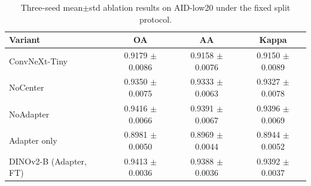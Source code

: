 \begin{table}[t]
  \centering
  \caption{Three-seed mean$\pm$std ablation results on AID-low20 under the fixed split protocol.}
  \label{tab:aid-low20_ablation}
  \begin{tabular}{l c c c}
    \toprule
    Variant & OA & AA & Kappa \\
    \midrule
    ConvNeXt-Tiny & 0.9179 $\pm$ 0.0086 & 0.9158 $\pm$ 0.0076 & 0.9150 $\pm$ 0.0089 \\
    NoCenter & 0.9350 $\pm$ 0.0075 & 0.9333 $\pm$ 0.0063 & 0.9327 $\pm$ 0.0078 \\
    NoAdapter & 0.9416 $\pm$ 0.0066 & 0.9391 $\pm$ 0.0067 & 0.9396 $\pm$ 0.0069 \\
    Adapter only & 0.8981 $\pm$ 0.0050 & 0.8969 $\pm$ 0.0044 & 0.8944 $\pm$ 0.0052 \\
    DINOv2-B (Adapter, FT) & 0.9413 $\pm$ 0.0036 & 0.9388 $\pm$ 0.0036 & 0.9392 $\pm$ 0.0037 \\
    \bottomrule
  \end{tabular}
\end{table}
